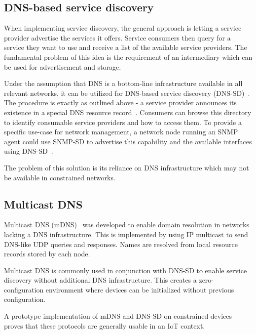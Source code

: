 \documentclass[conference]{IEEEtran}
\begin{document}
\subsection{DNS-based service discovery} %
\label{sub:dns_sd}
When implementing service discovery, the general approach is letting a service provider advertise the services it offers. Service consumers then query for a service they want to use and receive a list of the available service providers. The fundamental problem of this idea is the requirement of an intermediary which can be used for advertisement and storage.

Under the assumption that DNS is a bottom-line infrastructure available in all relevant networks, it can be utilized for DNS-based service discovery (DNS-SD)~\cite{rfc6763}. The procedure is exactly as outlined above - a service provider announces its existence in a special DNS resource record~\cite{rfc2782}. Consumers can browse this directory to identify consumable service providers and how to access them. To provide a specific use-case for network management, a network node running an SNMP agent could use SNMP-SD to advertise this capability and the available interfaces using DNS-SD~\cite{Tsou}.

The problem of this solution is its reliance on DNS infrastructure which may not be available in constrained networks.



\subsection{Multicast DNS} %
\label{sub:mdns}
Multicast DNS (mDNS)~\cite{rfc6762} was developed to enable domain resolution in networks lacking a DNS infrastructure. This is implemented by using IP multicast to send DNS-like UDP queries and responses. Names are resolved from local resource records stored by each node.

Multicast DNS is commonly used in conjunction with DNS-SD to enable service discovery without additional DNS infrastructure. This creates a zero-configuration environment where devices can be initialized without previous configuration.

A prototype implementation of mDNS and DNS-SD on constrained devices~\cite{Siljanovski} proves that these protocols are generally usable in an IoT context.


\end{document}

